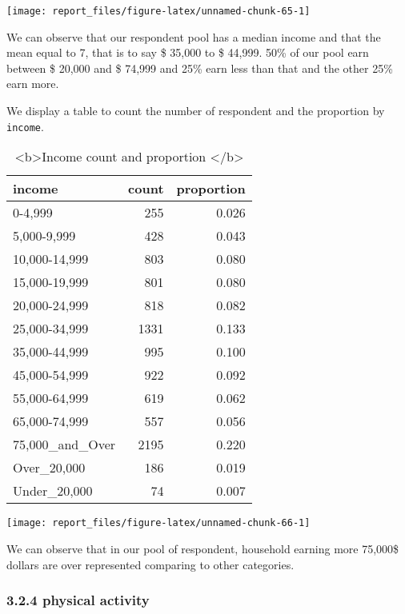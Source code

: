 \documentclass[
]{article}
\begin{document}
\begin{center}\texttt{[image: report\_files/figure-latex/unnamed-chunk-65-1]} \end{center}

We can observe that our respondent pool has a median income and that the
mean equal to 7, that is to say \$ 35,000 to \$ 44,999. 50\% of our pool
earn between \$ 20,000 and \$ 74,999 and 25\% earn less than that and
the other 25\% earn more.

We display a table to count the number of respondent and the proportion
by \texttt{income}.

\begin{table}

\caption{\label{tab:unnamed-chunk-66}<b>Income count and proportion </b>}
\centering
\begin{tabular}[t]{l|r|r}
\hline
income & count & proportion\\
\hline
0-4,999 & 255 & 0.026\\
\hline
5,000-9,999 & 428 & 0.043\\
\hline
10,000-14,999 & 803 & 0.080\\
\hline
15,000-19,999 & 801 & 0.080\\
\hline
20,000-24,999 & 818 & 0.082\\
\hline
25,000-34,999 & 1331 & 0.133\\
\hline
35,000-44,999 & 995 & 0.100\\
\hline
45,000-54,999 & 922 & 0.092\\
\hline
55,000-64,999 & 619 & 0.062\\
\hline
65,000-74,999 & 557 & 0.056\\
\hline
75,000\_and\_Over & 2195 & 0.220\\
\hline
Over\_20,000 & 186 & 0.019\\
\hline
Under\_20,000 & 74 & 0.007\\
\hline
\end{tabular}
\end{table}

\begin{center}\texttt{[image: report\_files/figure-latex/unnamed-chunk-66-1]} \end{center}

We can observe that in our pool of respondent, household earning more
75,000\$ dollars are over represented comparing to other categories.

\hypertarget{physical-activity}{%
\subsubsection{3.2.4 physical activity}\label{physical-activity}}
\end{document}
